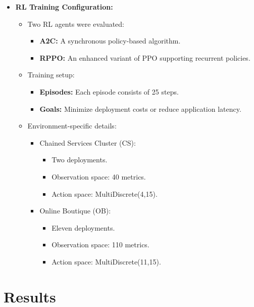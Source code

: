 \documentclass[conference]{IEEEtran}
\begin{document}
\begin{itemize}
    \item \textbf{RL Training Configuration:}
    \begin{itemize}
        \item Two RL agents were evaluated:
        \begin{itemize}
            \item \textbf{A2C:} A synchronous policy-based algorithm.
            \item \textbf{RPPO:} An enhanced variant of PPO supporting recurrent policies.
        \end{itemize}
        \item Training setup:
        \begin{itemize}
            \item \textbf{Episodes:} Each episode consists of 25 steps.
            \item \textbf{Goals:} Minimize deployment costs or reduce application latency.
        \end{itemize}
        \item Environment-specific details:
        \begin{itemize}
            \item Chained Services Cluster (CS):
            \begin{itemize}
                \item Two deployments.
                \item Observation space: 40 metrics.
                \item Action space: MultiDiscrete(4,15).
            \end{itemize}
            \item Online Boutique (OB):
            \begin{itemize}
                \item Eleven deployments.
                \item Observation space: 110 metrics.
                \item Action space: MultiDiscrete(11,15).
            \end{itemize}
        \end{itemize}
    \end{itemize}
\end{itemize}

\section{Results}
\label{sec:results}
\end{document}
